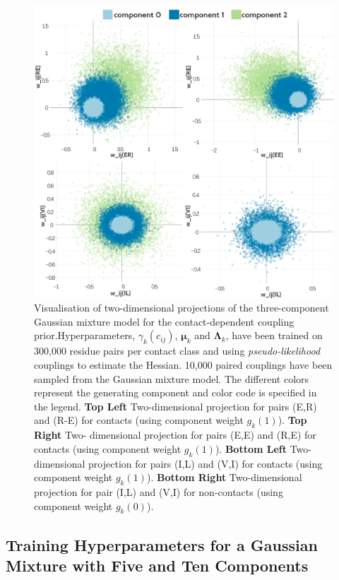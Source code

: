 \documentclass[11pt,a4paper,twoside]{book}
\newcommand{\Lk}{\mathbf{\Lambda}_k}
\newcommand{\muk}{\mathbf{\mu}_k}
\newcommand{\cij}{c_{ij}}
\theoremstyle{definition}
\theoremstyle{definition}
\theoremstyle{remark}
\begin{document}
\begin{figure}
\includegraphics[width=1\linewidth]{img/bayesian_model/pll/3/2dvis_combined_300k} \caption{Visualisation of two-dimensional
projections of the three-component Gaussian mixture model for the
contact-dependent coupling prior.Hyperparameters, \(\gamma_k(\cij)\),
\(\muk\) and \(\Lk\), have been trained on 300,000 residue pairs per
contact class and using \emph{pseudo-likelihood} couplings to estimate
the Hessian. 10,000 paired couplings have been sampled from the Gaussian
mixture model. The different colors represent the generating component
and color code is specified in the legend. \textbf{Top Left}
Two-dimensional projection for pairs (E,R) and (R-E) for contacts (using
component weight \(g_k(1)\)). \textbf{Top Right} Two- dimensional
projection for pairs (E,E) and (R,E) for contacts (using component
weight \(g_k(1)\)). \textbf{Bottom Left} Two-dimensional projection for
pairs (I,L) and (V,I) for contacts (using component weight \(g_k(1)\)).
\textbf{Bottom Right} Two-dimensional projection for pair (I,L) and
(V,I) for non-contacts (using component weight \(g_k(0)\)).}\label{fig:vis2d-pll-3comp-300k}
\end{figure}

\subsection{Training Hyperparameters for a Gaussian Mixture with Five
and Ten
Components}\label{training-hyperparameters-for-a-gaussian-mixture-with-five-and-ten-components}
\end{document}
